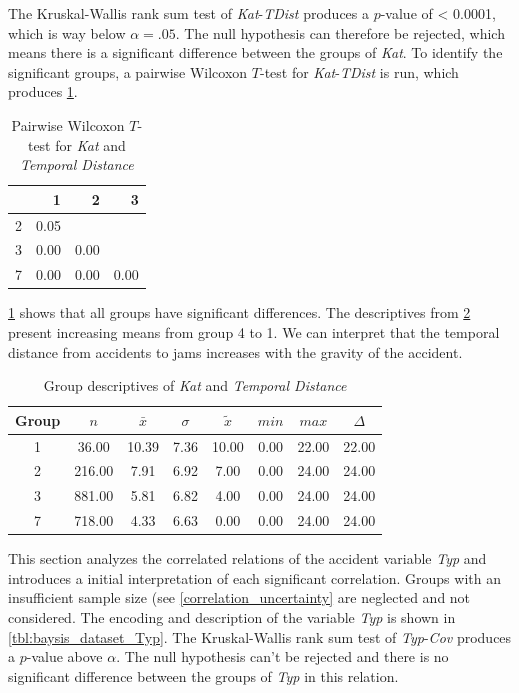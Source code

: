 The Kruskal-Wallis rank sum test of \textit{Kat}-\textit{TDist} produces a $p$-value of < 0.0001, which is way below $\alpha=.05$. The null hypothesis can therefore be rejected, which means there is a significant difference between the groups of \textit{Kat}. To identify the significant groups, a pairwise Wilcoxon $T$-test for \textit{Kat}-\textit{TDist} is run, which produces \cref{tbl:wilcoxon_baysis_matched_Kat_TDist}. 
\begin{table}[ht]
	\tiny
	\centering
	\begin{tabular}{rrrr}
		\toprule
		& 1 & 2 & 3 \\ 
		\midrule
		2 & 0.05 &  &  \\ 
		3 & 0.00 & 0.00 &  \\ 
		7 & 0.00 & 0.00 & 0.00 \\ 
		\bottomrule
	\end{tabular}
	\caption{Pairwise Wilcoxon $T$-test for \textit{Kat} and \textit{Temporal Distance}}
	\label{tbl:wilcoxon_baysis_matched_Kat_TDist}
\end{table}
\cref{tbl:wilcoxon_baysis_matched_Kat_TDist} shows that all groups have significant differences. The descriptives from \cref{tbl:descriptives_baysis_matched_Kat_TDist} present increasing means from group 4 to 1. We can interpret that the temporal distance from accidents to jams increases with the gravity of the accident.
\begin{table}[ht]
	\tiny
	\centering
	\begin{tabular}{c|c|c|c|c|c|c|c}
	  	\toprule
		Group & $n$ & $\bar{x}$ & $\sigma$ & $\tilde{x}$ & $min$ & $max$ & $\Delta$ \\ 
	  	\midrule
		1 & 36.00 & 10.39 & 7.36 & 10.00 & 0.00 & 22.00 & 22.00 \\ 
	  	2 & 216.00 & 7.91 & 6.92 & 7.00 & 0.00 & 24.00 & 24.00 \\ 
	  	3 & 881.00 & 5.81 & 6.82 & 4.00 & 0.00 & 24.00 & 24.00 \\ 
	  	7 & 718.00 & 4.33 & 6.63 & 0.00 & 0.00 & 24.00 & 24.00 \\ 
	   	\bottomrule
	\end{tabular}
	\caption{Group descriptives of \textit{Kat} and \textit{Temporal Distance}}
	\label{tbl:descriptives_baysis_matched_Kat_TDist}
\end{table}

This section analyzes the correlated relations of the accident variable \textit{Typ} and introduces a initial interpretation of each significant correlation. Groups with an insufficient sample size (see \cref{correlation_uncertainty} are neglected and not considered. The encoding and description of the variable \textit{Typ} is shown in \cref{tbl:baysis_dataset_Typ}. The Kruskal-Wallis rank sum test of \textit{Typ}-\textit{Cov} produces a $p$-value above $\alpha$. The null hypothesis can't be rejected and there is no significant difference between the groups of \textit{Typ} in this relation.

